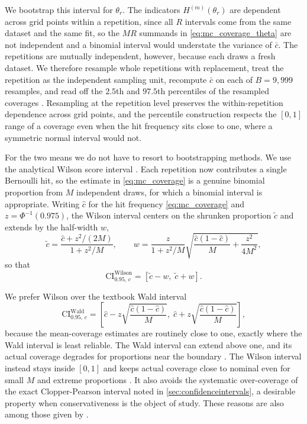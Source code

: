 We bootstrap this interval for $\theta_r$.
The indicators $H^{(m)}(\theta_r)$ are dependent across grid points within a repetition, since all $R$ intervals come from the same dataset and the same fit, so the $MR$ summands in \cref{eq:mc_coverage_theta} are not independent and a binomial interval would understate the variance of $\bar{c}$.
The repetitions are mutually independent, however, because each draws a fresh dataset.
We therefore resample whole repetitions with replacement, treat the repetition as the independent sampling unit, recompute $\bar{c}$ on each of $B = 9{,}999$ resamples, and read off the $2.5$th and $97.5$th percentiles of the resampled coverages \citep{Efron1979,CameronMiller2015}.
Resampling at the repetition level preserves the within-repetition dependence across grid points, and the percentile construction respects the $[0,1]$ range of a coverage even when the hit frequency sits close to one, where a symmetric normal interval would not.

For the two means we do not have to resort to bootstrapping methods.
We use the analytical Wilson score interval \citep{Wilson1927}.
Each repetition now contributes a single Bernoulli hit, so the estimate in \cref{eq:mc_coverage} is a genuine binomial proportion from $M$ independent draws, for which a binomial interval is appropriate.
Writing $\hat{c}$ for the hit frequency \cref{eq:mc_coverage} and $z = \Phi^{-1}(0.975)$, the Wilson interval centers on the shrunken proportion $\tilde{c}$ and extends by the half-width $w$,
\begin{equation}
\label{eq:wilson_parts}
    \tilde{c} = \frac{\hat{c} + z^{2}/(2M)}{1 + z^{2}/M},
    \qquad
    w = \frac{z}{1 + z^{2}/M}\sqrt{\frac{\hat{c}(1-\hat{c})}{M} + \frac{z^{2}}{4M^{2}}},
\end{equation}
so that
\begin{equation}
\label{eq:wilson}
    \mathrm{CI}^{\mathrm{Wilson}}_{0.95,\,c} = \left[\tilde{c} - w,\; \tilde{c} + w\right].
\end{equation}

We prefer Wilson over the textbook Wald interval
\begin{equation}
\label{eq:wald}
    \mathrm{CI}^{\mathrm{Wald}}_{0.95,\,c} = \left[\hat{c} - z\sqrt{\frac{\hat{c}(1-\hat{c})}{M}},\; \hat{c} + z\sqrt{\frac{\hat{c}(1-\hat{c})}{M}}\right],
\end{equation}
because the mean-coverage estimates are routinely close to one, exactly where the Wald interval is least reliable.
The Wald interval can extend above one, and its actual coverage degrades for proportions near the boundary \citep{BrownCaiDasGupta2001}.
The Wilson interval instead stays inside $[0,1]$ and keeps actual coverage close to nominal even for small $M$ and extreme proportions \citep{BrownCaiDasGupta2001}.
It also avoids the systematic over-coverage of the exact Clopper-Pearson interval \citep{ClopperPearson1934} noted in \cref{sec:confidenceintervals}, a desirable property when conservativeness is the object of study.
These reasons are also among those given by \citet{Newcombe1998}.
